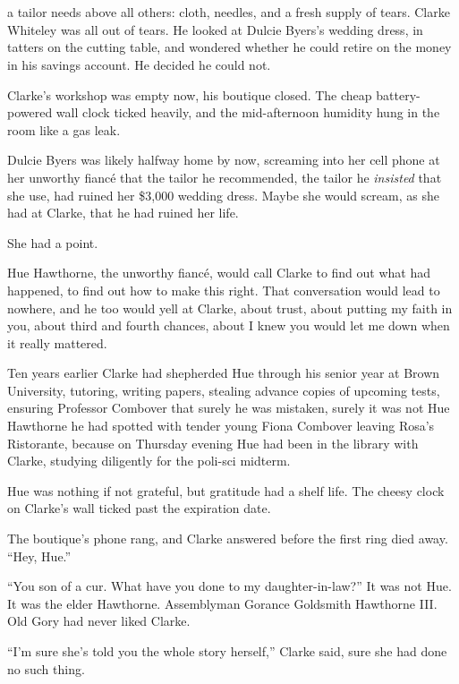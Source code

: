 \chapter{\previewtitle}
\useemptypageframes

 a tailor needs above all others: cloth, needles,
and a fresh supply of tears. Clarke Whiteley was all out of tears. He
looked at Dulcie Byers's wedding dress, in tatters on the cutting table,
and wondered whether he could retire on the money in his savings
account. He decided he could not.

Clarke's workshop was empty now, his boutique closed. The cheap
battery-powered wall clock ticked heavily, and the mid-afternoon
humidity hung in the room like a gas leak.

Dulcie Byers was likely halfway home by now, screaming into her cell
phone at her unworthy fianc\'e that the tailor he recommended, the tailor
he \emph{insisted} that she use, had ruined her \$3,000 wedding dress.
Maybe she would scream, as she had at Clarke, that he had ruined her
life.

She had a point.

Hue Hawthorne, the unworthy fianc\'e, would call Clarke to find out what
had happened, to find out how to make this right. That conversation
would lead to nowhere, and he too would yell at Clarke, about trust,
about putting my faith in you, about third and fourth chances, about I
knew you would let me down when it really mattered.

Ten years earlier Clarke had shepherded Hue through his senior year at
Brown University, tutoring, writing papers, stealing advance copies of
upcoming tests, ensuring Professor Combover that surely he was mistaken,
surely it was not Hue Hawthorne he had spotted with tender young Fiona
Combover leaving Rosa's Ristorante, because on Thursday evening Hue had
been in the library with Clarke, studying diligently for the poli-sci
midterm.

Hue was nothing if not grateful, but gratitude had a shelf life. The
cheesy clock on Clarke's wall ticked past the expiration date.

The boutique's phone rang, and Clarke answered before the first ring
died away. ``Hey, Hue.''

``You son of a cur. What have you done to my daughter-in-law?'' It was not
Hue. It was the elder Hawthorne. Assemblyman Gorance Goldsmith Hawthorne
III. Old Gory had never liked Clarke.

``I'm sure she's told you the whole story herself,'' Clarke said, sure she
had done no such thing.

